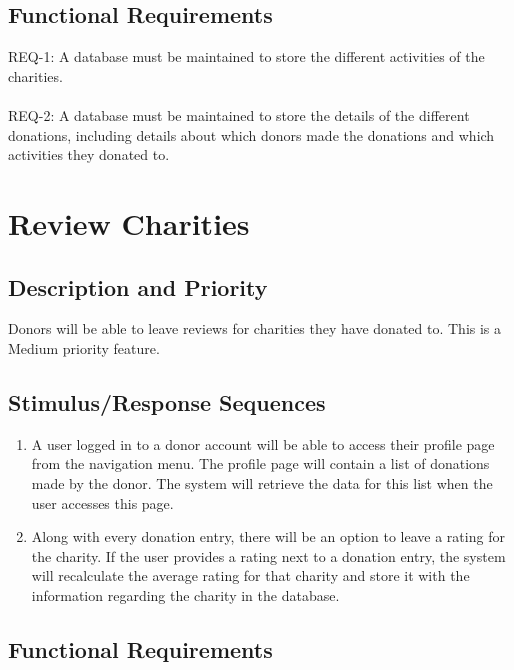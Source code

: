 \documentclass{scrreprt}
\begin{document}
\subsection{Functional Requirements}

REQ-1:	A database must be maintained to store the different activities of the charities.\\
\\REQ-2:	A database must be maintained to store the details of the different donations, including details about which donors made the donations and which activities they donated to.\\


\section{Review Charities}

\vspace{1cm}

\subsection{Description and Priority}

Donors will be able to leave reviews for charities they have donated to. This is a Medium priority feature.\\

\subsection{Stimulus/Response Sequences}

\begin{enumerate}[label=(\alph*)]
\item A user logged in to a donor account will be able to access their profile page from the navigation menu. The profile page will contain a list of donations made by the donor. The system will retrieve the data for this list when the user accesses this page.
\item Along with every donation entry, there will be an option to leave a rating for the charity. If the user provides a rating next to a donation entry, the system will recalculate the average rating for that charity and store it with the information regarding the charity in the database.\\

\end{enumerate}

\subsection{Functional Requirements}
\end{document}
